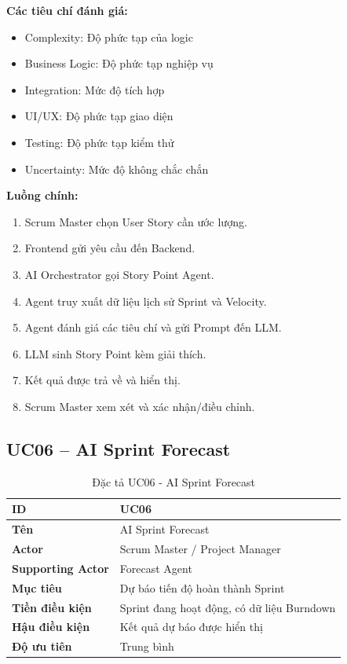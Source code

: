 \documentclass[12pt,a4paper]{report}
\begin{document}
\textbf{Các tiêu chí đánh giá:}

\begin{itemize}
\item Complexity: Độ phức tạp của logic
\item Business Logic: Độ phức tạp nghiệp vụ
\item Integration: Mức độ tích hợp
\item UI/UX: Độ phức tạp giao diện
\item Testing: Độ phức tạp kiểm thử
\item Uncertainty: Mức độ không chắc chắn
\end{itemize}

\textbf{Luồng chính:}

\begin{enumerate}
\item Scrum Master chọn User Story cần ước lượng.
\item Frontend gửi yêu cầu đến Backend.
\item AI Orchestrator gọi Story Point Agent.
\item Agent truy xuất dữ liệu lịch sử Sprint và Velocity.
\item Agent đánh giá các tiêu chí và gửi Prompt đến LLM.
\item LLM sinh Story Point kèm giải thích.
\item Kết quả được trả về và hiển thị.
\item Scrum Master xem xét và xác nhận/điều chỉnh.
\end{enumerate}

\subsection{UC06 -- AI Sprint Forecast}

\begin{table}[H]
\centering
\caption{Đặc tả UC06 - AI Sprint Forecast}
\begin{tabular}{|p{4cm}|p{11cm}|}
\hline
\textbf{ID} & UC06 \\
\hline
\textbf{Tên} & AI Sprint Forecast \\
\hline
\textbf{Actor} & Scrum Master / Project Manager \\
\hline
\textbf{Supporting Actor} & Forecast Agent \\
\hline
\textbf{Mục tiêu} & Dự báo tiến độ hoàn thành Sprint \\
\hline
\textbf{Tiền điều kiện} & Sprint đang hoạt động, có dữ liệu Burndown \\
\hline
\textbf{Hậu điều kiện} & Kết quả dự báo được hiển thị \\
\hline
\textbf{Độ ưu tiên} & Trung bình \\
\hline
\end{tabular}
\end{table}
\end{document}
